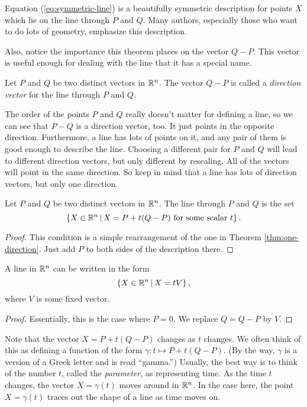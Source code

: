 \documentclass[elementsmain.tex]{subfiles}
\begin{document}
Equation (\ref{eq:symmetric-line}) is a beautifully symmetric description 
for points $X$ which lie on the line through $P$ and $Q$. Many authors, especially 
those who want to do lots of geometry, emphasize this description.

Also, notice the importance this theorem places on the vector $Q-P$. This vector is
useful enough for dealing with the line that it has a special name.

\begin{definition}
Let $P$ and $Q$ be two distinct vectors in $\mathbb{R}^n$. The vector $Q-P$ is called a \emph{direction vector} for the line through $P$ and $Q$.
\end{definition}

The order of the points $P$ and $Q$ really doesn't matter for defining a line, so we can see that $P-Q$ is a direction vector, too. It just points in the opposite direction. Furthermore, a line has lots of points on it, and any pair of them is good enough to 
describe the line. Choosing a different pair for $P$ and $Q$ will lead to different direction vectors, but only different by rescaling. All of the vectors will point in the same direction. So keep in mind that a line has lots of direction vectors, but only one direction.

\begin{corollary}\label{cor:parametric-line}
Let $P$ and $Q$ be two distinct vectors in $\mathbb{R}^n$. The line through $P$ and $Q$ is the set
\[
\left\{ X \in \mathbb{R}^n \,\middle|\, X = P + t(Q-P) \text{ for some scalar $t$}\right\}.
\]
\end{corollary}

\begin{proof}
This condition is a simple rearrangement of the one in Theorem \ref{thm:one-direction}. Just add $P$ to both sides of the description there.
\end{proof}

\begin{corollary}
A line in $\mathbb{R}^n$ can be written in the form
\[
\left\{ X \in \mathbb{R}^n \,\middle|\, X = t V \right\},
\]
where $V$ is some fixed vector.
\end{corollary}

\begin{proof}
Essentially, this is the case where $P=0$. We replace $Q = Q-P$ by $V$.
\end{proof}

Note that the vector $X = P + t(Q-P)$ changes as $t$ changes. We often think of this as
defining a function of the form $\gamma: t \mapsto P + t(Q-P)$. (By the way, $\gamma$ is a version of a Greek letter and is read ``gamma.'') Usually, the best way is
to think of the number $t$, called the \emph{parameter}, as representing time. As the time $t$ changes, the vector $X = \gamma(t)$ moves around in $\mathbb{R}^n$. In the case here, 
the point $X=\gamma(t)$ traces out the shape of a line as time moves on. 
\end{document}

